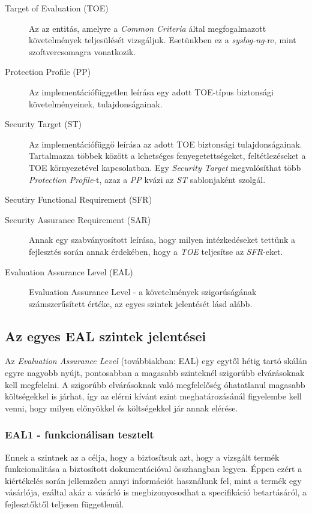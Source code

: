 \begin{description}
    \item[Target of Evaluation (TOE)] {Az az entitás, amelyre a \emph{Common Criteria} által
        megfogalmazott követelmények teljesülését vizsgáljuk. Esetünkben ez a \emph{syslog-ng}-re,
        mint szoftvercsomagra vonatkozik.}
    \item[Protection Profile (PP)] { Az implementációfüggetlen leírása egy adott TOE-típus
        biztonsági követelményeinek, tulajdonságainak. }
    \item[Security Target (ST)] { Az implementációfüggő leírása az adott TOE biztonsági
        tulajdonságainak. Tartalmazza többek között a lehetséges fenyegetettségeket, feltétlezéseket
        a TOE környezetével kapcsolatban. Egy \emph{Security Target} megvalósíthat több
        \emph{Protection Profile}-t, azaz a \emph{PP} kvázi az \emph{ST} sablonjaként szolgál. }
    \item[Secutiry Functional Requirement (SFR)] { }
    \item[Security Assurance Requirement (SAR)] { Annak egy szabványosított leírása, hogy milyen
        intézkedéseket tettünk a fejlesztés során annak érdekében, hogy a \emph{TOE} teljesítse az
        \emph{SFR}-eket.}
    \item[Evaluation Assurance Level (EAL)]{Evaluation Assurance Level - a követelmények
        szigorúságának számszerűsített értéke, az egyes szintek jelentését lásd alább.}
\end{description}

\subsection{Az egyes EAL szintek jelentései}

Az \emph{Evaluation Assurance Level} (továbbiakban: EAL) egy egytől hétig tartó skálán egyre nagyobb
nyújt, pontosabban a magasabb szinteknél szigorúbb elvárásoknak kell megfelelni. A szigorúbb
elvárásoknak való megfelelőség óhatatlanul magasabb költségekkel is járhat, így az elérni kívánt
szint meghatározásánál figyelembe kell venni, hogy milyen előnyökkel és költségekkel jár annak
elérése.

\subsubsection{EAL1 - funkcionálisan tesztelt}
Ennek a szintnek az a célja, hogy a biztosítsuk azt, hogy a vizsgált termék funkcionalitása a
biztosított dokumentációval összhangban legyen. Éppen ezért a kiértékelés során jellemzően annyi
információt használunk fel, mint a termék egy vásárlója, ezáltal akár a vásárló is megbizonyosodhat
a specifikáció betartásáról, a fejlesztőktől teljesen függetlenül.

